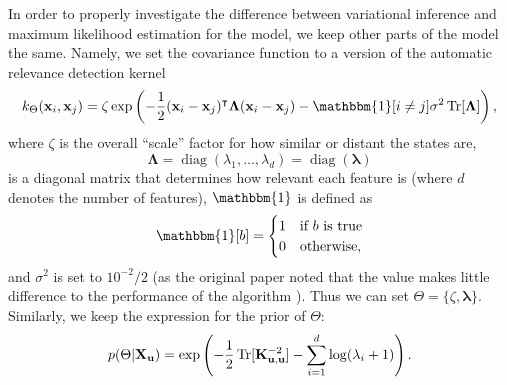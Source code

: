 \documentclass{mprop}
\theoremstyle{definition}
\DeclareMathOperator{\Tr}{Tr}
\DeclareMathOperator{\diag}{diag}
\begin{document}

In order to properly investigate the difference between variational inference
and maximum likelihood estimation for the model, we keep other parts of the
model the same. Namely, we set the covariance function to a version of the
automatic relevance detection kernel
\cite{DBLP:conf/nips/LevinePK11,neal2012bayesian}
\[ k_\Theta(\mathbf{x}_i, \mathbf{x}_j) = \zeta\exp\left(
    -\frac{1}{2}(\mathbf{x}_i - \mathbf{x}_j)^\intercal\bm\Lambda(\mathbf{x}_i -
    \mathbf{x}_j) - \mathbbm{1}[i \ne j]\sigma^2\Tr[\bm\Lambda] \right), \]
where $\zeta$ is the overall ``scale'' factor for how similar or distant the
states are,
\[ \bm\Lambda = \diag(\lambda_1, \dots, \lambda_d) = \diag(\bm\lambda) \]
is a diagonal matrix that determines how relevant each feature is (where $d$
denotes the number of features), $\mathbbm{1}$ is defined as
\[ \mathbbm{1}[b] = \begin{cases}
    1 & \mbox{if $b$ is true} \\
    0 & \mbox{otherwise},
  \end{cases} \]
and $\sigma^2$ is set to $10^{-2}/2$ (as the original paper noted that
the value makes little difference to the performance of the algorithm
\cite{DBLP:conf/nips/LevinePK11}). Thus we can set $\Theta = \{ \zeta,
\bm\lambda \}$. Similarly, we keep the expression for the prior of $\Theta$:
\begin{equation} \label{eq:theta_prior}
  p(\Theta | \mathbf{X_u}) = \exp\left( -\frac{1}{2}\Tr[\Kuu^{-2}] -
    \sum_{i=1}^d \log(\lambda_i + 1) \right).
\end{equation}
\end{document}
